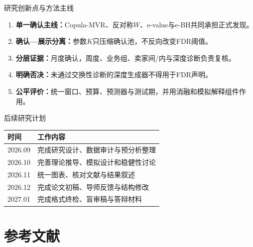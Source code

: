 \documentclass[aspectratio=169]{beamer}
\begin{document}
\begin{frame}[shrink=6]{研究创新点与方法主线}
  \begin{enumerate}
    \item \textbf{单一确认主线：}Copula-MVR、反对称$W$、e-value与e-BH共同承担正式发现。
    \item \textbf{确认—展示分离：}参数$K$只压缩确认池，不反向改变FDR阈值。
    \item \textbf{分层证据：}月度确认，周度、业务组、卖家间/内与深度诊断负责复核。
    \item \textbf{明确否决：}未通过交换性诊断的深度生成器不得用于FDR声明。
    \item \textbf{公平评价：}统一窗口、预算、预测器与测试期，并用消融和模拟解释组件作用。
  \end{enumerate}
\end{frame}

\begin{frame}{后续研究计划}
  \begin{table}
    \centering
    \small
    \begin{tabular}{lp{}}
      \toprule
      时间 & 工作内容 \\
      \midrule
      2026.09 & 完成研究设计、数据审计与预分析整理 \\
      2026.10 & 完善理论推导、模拟设计和稳健性讨论 \\
      2026.11 & 统一图表、核对文献与结果叙述 \\
      2026.12 & 完成论文初稿、导师反馈与结构修改 \\
      2027.01 & 完成格式终检、盲审稿与答辩材料 \\
      \bottomrule
    \end{tabular}
  \end{table}
\end{frame}

\section{参考文献}
\end{document}
